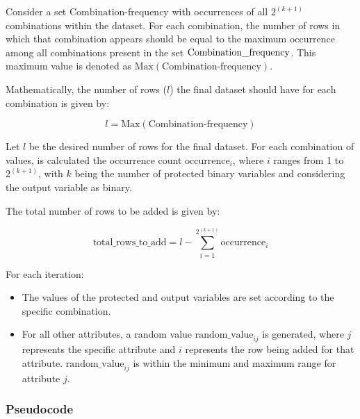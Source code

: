 \documentclass[12pt,a4paper,openright,twoside]{book}
\begin{document}
Consider a set \( \text{Combination-frequency} \) with occurrences of all \( 2^{(k+1)} \) combinations within the dataset. For each combination, the number of rows in which that combination appears should be equal to the maximum occurrence among all combinations present in the set \( \text{Combination\textunderscore frequency} \). This maximum value is denoted as \( \text{Max}(\text{Combination-frequency}) \).

Mathematically, the number of rows (\( l \)) the final dataset should have for each combination is given by:

\[
l = \text{Max}(\text{Combination-frequency})
\]



Let \( l \) be the desired number of rows for the final dataset. For each combination of values, is calculated the occurrence count \( \text{occurrence}_i \), where \( i \) ranges from 1 to \( 2^{(k+1)} \), with \( k \) being the number of protected binary variables and considering the output variable as binary.

The total number of rows to be added is given by:

\[
\text{total\_rows\_to\_add} = l - \sum_{i=1}^{2^{(k+1)}} \text{occurrence}_i
\]

For each iteration:

\begin{itemize}

    \item The values of the protected and output variables are set according to the specific combination.
    
    \item For all other attributes, a random value \( \text{random\_value}_{ij} \) is generated, where \( j \) represents the specific attribute and \( i \) represents the row being added for that attribute. \( \text{random\_value}_{ij} \) is within the minimum and maximum range for attribute \( j \).

\end{itemize}

\subsubsection{Pseudocode}
\end{document}
